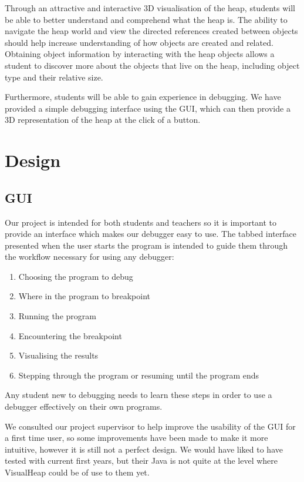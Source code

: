 \documentclass[11pt, a4paper]{report}
\begin{document}
Through an attractive and interactive 3D visualisation of the heap, students will be able to better understand and comprehend what the heap is. The ability to navigate the heap world and view the directed references created between objects should help increase understanding of how objects are created and related. Obtaining object information by interacting with the heap objects allows a student to discover more about the objects that live on the heap, including object type and their relative size.

Furthermore, students will be able to gain experience in debugging. We have provided a simple debugging interface using the GUI, which can then provide a 3D representation of the heap at the click of a button. 

\chapter{Design}

\section{GUI}

Our project is intended for both students and teachers so it is important to provide an interface which makes our debugger easy to use. The tabbed interface presented when the user starts the program is intended to guide them through the workflow necessary for using any debugger:

\begin{enumerate}

  \item Choosing the program to debug
  \item Where in the program to breakpoint
  \item Running the program
  \item Encountering the breakpoint
  \item Visualising the results
  \item Stepping through the program or resuming until the program ends
  
\end{enumerate}

Any student new to debugging needs to learn these steps in order to use a debugger effectively on their own programs.

We consulted our project supervisor to help improve the usability of the GUI for a first time user, so some improvements have been made to make it more intuitive, however it is still not a perfect design. We would have liked to have tested with current first years, but their Java is not quite at the level where VisualHeap could be of use to them yet. 
\end{document}
